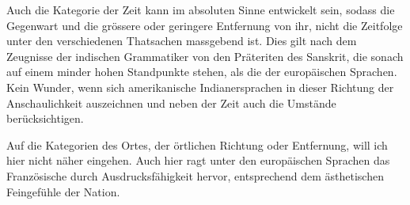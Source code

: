 Auch die Kategorie der Zeit kann im absoluten Sinne entwickelt sein, sodass die Gegenwart und die grössere oder geringere Entfernung von ihr, nicht die Zeitfolge unter den verschiedenen Thatsachen massgebend ist. Dies gilt nach dem Zeugnisse der indischen Grammatiker von den Präteriten des Sanskrit, die sonach auf einem minder hohen Standpunkte stehen, als die der europäischen Sprachen. Kein Wunder, wenn sich amerikanische Indianersprachen in dieser Richtung der Anschaulichkeit auszeichnen und neben der Zeit auch die Umstände berücksichtigen.

Auf die Kategorien des Ortes, der örtlichen Richtung oder Entfernung, will ich hier nicht näher eingehen. Auch hier ragt unter den europäischen Sprachen das Französische durch Ausdrucksfähigkeit hervor, entsprechend dem ästhetischen Feingefühle der Nation.

